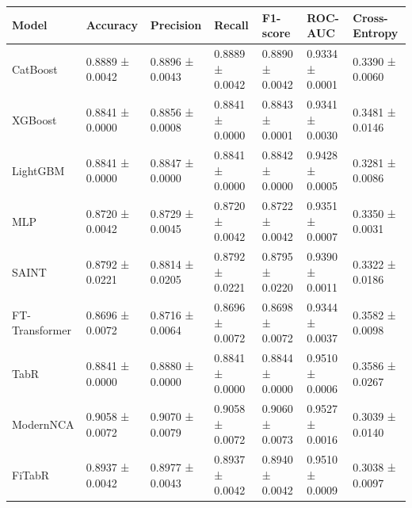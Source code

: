 \begin{tabular}{lllllll}
\toprule
Model & Accuracy & Precision & Recall & F1-score & ROC-AUC & Cross-Entropy \\
\midrule
CatBoost & 0.8889 ± 0.0042 & 0.8896 ± 0.0043 & 0.8889 ± 0.0042 & 0.8890 ± 0.0042 & 0.9334 ± 0.0001 & 0.3390 ± 0.0060 \\
XGBoost & 0.8841 ± 0.0000 & 0.8856 ± 0.0008 & 0.8841 ± 0.0000 & 0.8843 ± 0.0001 & 0.9341 ± 0.0030 & 0.3481 ± 0.0146 \\
LightGBM & 0.8841 ± 0.0000 & 0.8847 ± 0.0000 & 0.8841 ± 0.0000 & 0.8842 ± 0.0000 & 0.9428 ± 0.0005 & 0.3281 ± 0.0086 \\
MLP & 0.8720 ± 0.0042 & 0.8729 ± 0.0045 & 0.8720 ± 0.0042 & 0.8722 ± 0.0042 & 0.9351 ± 0.0007 & 0.3350 ± 0.0031 \\
SAINT & 0.8792 ± 0.0221 & 0.8814 ± 0.0205 & 0.8792 ± 0.0221 & 0.8795 ± 0.0220 & 0.9390 ± 0.0011 & 0.3322 ± 0.0186 \\
FT-Transformer & 0.8696 ± 0.0072 & 0.8716 ± 0.0064 & 0.8696 ± 0.0072 & 0.8698 ± 0.0072 & 0.9344 ± 0.0037 & 0.3582 ± 0.0098 \\
TabR & 0.8841 ± 0.0000 & 0.8880 ± 0.0000 & 0.8841 ± 0.0000 & 0.8844 ± 0.0000 & 0.9510 ± 0.0006 & 0.3586 ± 0.0267 \\
ModernNCA & 0.9058 ± 0.0072 & 0.9070 ± 0.0079 & 0.9058 ± 0.0072 & 0.9060 ± 0.0073 & 0.9527 ± 0.0016 & 0.3039 ± 0.0140 \\
FiTabR & 0.8937 ± 0.0042 & 0.8977 ± 0.0043 & 0.8937 ± 0.0042 & 0.8940 ± 0.0042 & 0.9510 ± 0.0009 & 0.3038 ± 0.0097 \\
\bottomrule
\end{tabular}
